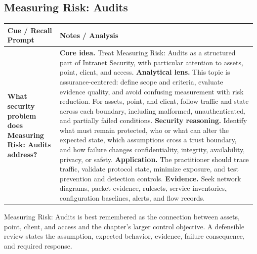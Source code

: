 \documentclass[11pt]{article}
\newcommand{\CornellHeader}{%
\rowcolor{Navy}\color{white}\bfseries Cue / Recall Prompt & \color{white}\bfseries Notes / Analysis\\\hline}
\newcommand{\CornellRow}[2]{%
\cellcolor{CueGray}\RaggedRight\textbf{#1} & \RaggedRight #2\\\hline}
\begin{document}
\subsection*{Measuring Risk: Audits}
\begin{longtable}{>{\RaggedRight\arraybackslash}p{}|>{\RaggedRight\arraybackslash}p{}}
\CornellHeader
\CornellRow{What security problem does Measuring Risk: Audits address?}{\textbf{Core idea.} Treat Measuring Risk: Audits as a structured part of Intranet Security, with particular attention to assets, point, client, and access. \textbf{Analytical lens.} This topic is assurance-centered: define scope and criteria, evaluate evidence quality, and avoid confusing measurement with risk reduction. For assets, point, and client, follow traffic and state across each boundary, including malformed, unauthenticated, and partially failed conditions. \textbf{Security reasoning.} Identify what must remain protected, who or what can alter the expected state, which assumptions cross a trust boundary, and how failure changes confidentiality, integrity, availability, privacy, or safety. \textbf{Application.} The practitioner should trace traffic, validate protocol state, minimize exposure, and test prevention and detection controls. \textbf{Evidence.} Seek network diagrams, packet evidence, rulesets, service inventories, configuration baselines, alerts, and flow records.}
\end{longtable}
\begin{topicsummary}
Measuring Risk: Audits is best remembered as the connection between assets, point, client, and access and the chapter's larger control objective. A defensible review states the assumption, expected behavior, evidence, failure consequence, and required response.
\end{topicsummary}
\end{document}
